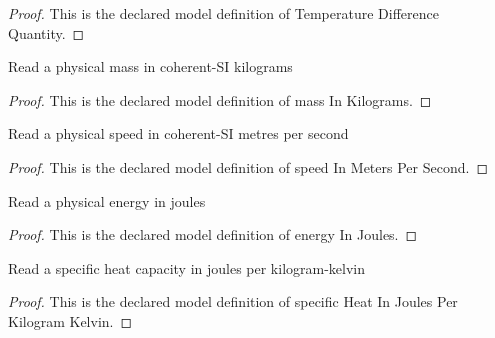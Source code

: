 \begin{proof}
  This is the declared model definition of Temperature Difference Quantity.
\end{proof}
\begin{definition}
  \label{def:physics:phyx-mini-0486:phyxminiproblems-problemphyxmini0486-massinkilograms}
  Read a physical mass in coherent-SI kilograms
\end{definition}
\begin{proof}
  This is the declared model definition of mass In Kilograms.
\end{proof}
\begin{definition}
  \label{def:physics:phyx-mini-0486:phyxminiproblems-problemphyxmini0486-speedinmeterspersecond}
  Read a physical speed in coherent-SI metres per second
\end{definition}
\begin{proof}
  This is the declared model definition of speed In Meters Per Second.
\end{proof}
\begin{definition}
  \label{def:physics:phyx-mini-0486:phyxminiproblems-problemphyxmini0486-energyinjoules}
  Read a physical energy in joules
\end{definition}
\begin{proof}
  This is the declared model definition of energy In Joules.
\end{proof}
\begin{definition}
  \label{def:physics:phyx-mini-0486:phyxminiproblems-problemphyxmini0486-specificheatinjoulesperkilogramkelvin}
  Read a specific heat capacity in joules per kilogram-kelvin
\end{definition}
\begin{proof}
  This is the declared model definition of specific Heat In Joules Per Kilogram Kelvin.
\end{proof}
